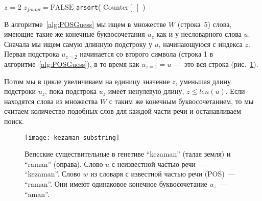 \begin{algorithm}
    $z$ = 2 
    $z_{found} = \text{FALSE}$ \;
    \BlankLine
    \BlankLine
    \verb|arsort|( $\text{Counter} \left[ \; \right]$ )
\end{algorithm}


В алгоритме~\ref{alg:POSGuess} мы ищем в множестве $W$ (строка~5) слова, имеющие такие же конечные буквосочетания $u_z$ как и  у несловарного слова $u$. 
Сначала мы ищем самую длинную подстроку у $u$, начинающуюся с индекса $z$. 
Первая подстрока $u_{z=2}$ начинается со второго символа (строка 1 в алгоритме~\ref{alg:POSGuess}), в то время как $u_{z=1} = u$~--- это вся строка (рис.~\ref{fig:kezaman_substring}). 

Потом мы в цикле увеличиваем на единицу значение $z$, уменьшая длину подстроки $u_z$, 
пока подстрока $u_z$ имеет ненулевую длину, $z \leq len(u)$.
Если находятся слова из множества $W$ с таким же конечным буквосочетанием, то мы считаем количество подобных слов для каждой части речи и останавливаем поиск.

\begin{figure}
    \centering
	\texttt{[image: kezaman\_substring]}
	\caption{Вепсские существительные в генетиве ``kezaman'' (талая земля) и ``raman'' (оправа). 
	Слово $u$ 
	с неизвестной частью речи~--- ``kezaman''. 
	Слово $w$ из словаря с известной частью речи (POS)~--- ``raman''. 
	Они имеют одинаковое конечное буквосочетание $u_z$~--- ``aman''.} 
	\label{fig:kezaman_substring}
\end{figure}

